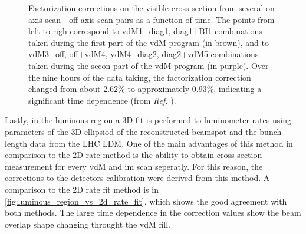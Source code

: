 \begin{figure}[!htb]
	\centering
	\caption[Factorization corrections on visible cross-section from 2D rate fit method]{Factorization corrections on the visible cross section from several on-axis scan - off-axis scan pairs as a function of time. The points from left to righ correspond to vdM1+diag1, diag1+BI1 combinations taken during the first part of the vdM program (in brown), and to vdM3+off, off+vdM4, vdM4+diag2, diag2+vdM5 combinations taken during the secon part of the vdM program (in purple). Over the nine hours of the data taking, the factorization correction changed from about 2.62\% to approximately 0.93\%, indicating a significant time dependence (from \textit{Ref.} \cite{CMS-DP-2024-068}).}
	\label{fig:2d_rate_fit_xsec_corrections}
\end{figure}

Lastly, in the luminous region a 3D fit is performed to luminometer rates using parameters of the 3D ellipsiod of the reconstructed beamspot and the bunch length data from the LHC LDM. One of the main advantages of this method in comparison to the 2D rate method is the ability to obtain cross section measurement for every vdM and im scan seperatly. For this reason, the corrections to the detectors calibration were derived from this method. A comparison to the 2D rate fit method is in \autoref{fig:luminous_region_vs_2d_rate_fit}, which shows the good agreement with both methods. The large time dependence in the correction values show the beam overlap shape changing throught the vdM fill.

